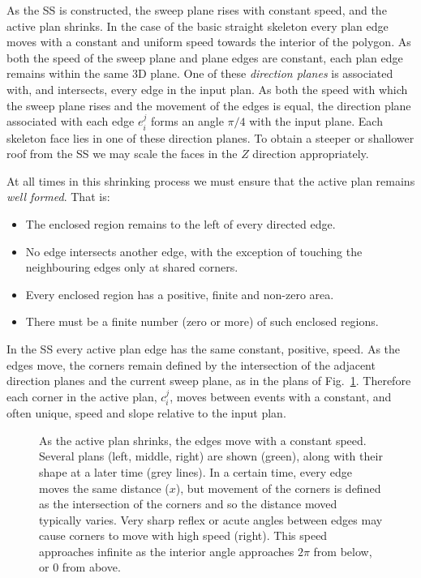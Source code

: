 As the SS is constructed, the sweep plane rises with constant speed, and the active plan shrinks. In the case of the basic straight skeleton every plan edge moves with a constant and uniform speed towards the interior of the polygon. As both the speed of the sweep plane and plane edges are constant, each plan edge remains within the same 3D plane. One of these \emph{direction planes} is associated with, and intersects, every edge in the input plan. As both the speed with which the sweep plane rises and the movement of the edges is equal, the direction plane associated with each edge  $e^j_i$ forms an angle $\pi/4$ with the input plane. Each skeleton face lies in one of these direction planes. To obtain a steeper or shallower roof from the SS we may scale the faces in the $Z$ direction appropriately. 

At all times in this shrinking process we must ensure that the active plan remains \emph{well formed}. That is:

\begin{itemize}
\item{The enclosed region remains to the left of every directed edge.}
\item{No edge intersects another edge, with the exception of touching the neighbouring edges only at shared corners.}
\item{Every enclosed region has a positive, finite and non-zero area.}
\item{There must be a finite number (zero or more) of such enclosed regions.}
\end{itemize}

In the SS every active plan edge has the same constant, positive, speed. As the edges move, the corners remain defined by the intersection of the adjacent direction planes and the current sweep plane, as in the plans of Fig.~\ref{fig:skel_edge}. Therefore each corner in the active plan, $c^j_i$, moves between events with a constant, and often unique, speed and slope relative to the input plan.

\begin{figure}
  \centering
  \def\svgwidth{0.8\columnwidth}
  
  \caption[A moving plan edge]{\label{fig:skel_edge}As the active plan shrinks, the edges move with a constant speed. Several plans (left, middle, right) are shown (green), along with their shape at a later time (grey lines). In a certain time, every edge moves the same distance ($x$), but movement of the corners is defined as the intersection of the corners and so the distance moved typically varies. Very sharp reflex or acute angles between edges may cause corners to move with high speed (right). This speed approaches infinite as the interior angle approaches $2\pi$ from below, or $0$ from above.}
\end{figure}

